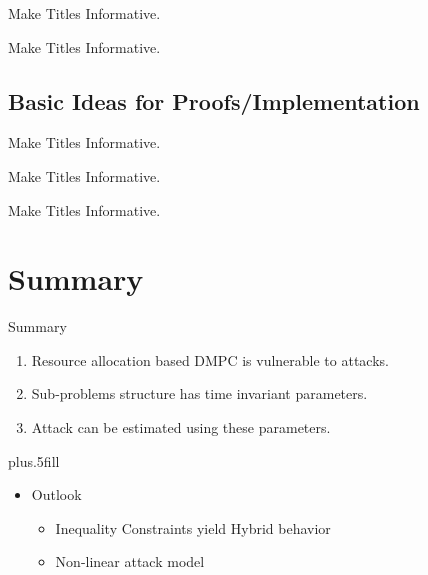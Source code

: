 \documentclass[aspectratio=169]{beamer}
\newcommand{\1}{\mathbf{1}}
\newcommand{\0}{\mathbf{0}}
\begin{document}
\begin{frame}{Make Titles Informative.}
\end{frame}

\begin{frame}{Make Titles Informative.}
\end{frame}


\subsection{Basic Ideas for Proofs/Implementation}

\begin{frame}{Make Titles Informative.}
\end{frame}

\begin{frame}{Make Titles Informative.}
\end{frame}

\begin{frame}{Make Titles Informative.}
\end{frame}



\section*{Summary}

\begin{frame}{Summary}
  \begin{minipage}{.6\textwidth}
    \begin{enumerate}
      \item
            Resource allocation based DMPC is vulnerable to attacks.
      \item
            Sub-problems structure has time invariant parameters.
      \item
            Attack can be estimated using these parameters.
    \end{enumerate}

    \vskip0pt plus.5fill
    \begin{itemize}
      \item
            Outlook
            \begin{itemize}
              \item
                    Inequality Constraints yield Hybrid behavior
              \item
                    Non-linear attack model
            \end{itemize}
    \end{itemize}
  \end{minipage}
\end{frame}
\end{document}

